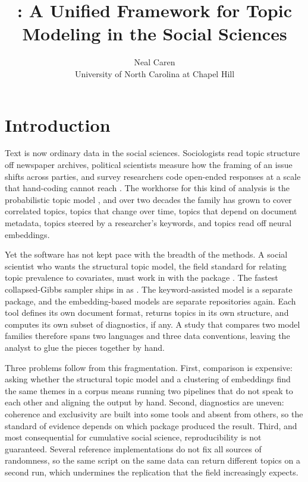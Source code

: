 \documentclass[article]{jss}
\author{Neal Caren\\University of North Carolina at Chapel Hill}
\title{\pkg{topica}: A Unified \proglang{Python} Framework for Topic Modeling
in the Social Sciences}
\begin{document}
\section{Introduction}\label{sec:intro}

Text is now ordinary data in the social sciences. Sociologists read topic
structure off newspaper archives, political scientists measure how the framing
of an issue shifts across parties, and survey researchers code open-ended
responses at a scale that hand-coding cannot reach \citep{dimaggio2013exploiting,
grimmer2013text, roberts2014structural, gentzkow2019text, grimmer2022text}. The
workhorse for this kind of analysis is the probabilistic topic model
\citep{blei2003lda, blei2012probabilistic}, and over two decades the family has
grown to cover correlated topics, topics that change over time, topics that
depend on document metadata, topics steered by a researcher's keywords, and
topics read off neural embeddings.

Yet the software has not kept pace with the breadth of the methods. A social
scientist who wants the structural topic model, the field standard for relating
topic prevalence to covariates, must work in  with the 
package \citep{roberts2016model, roberts2019stm}. The fastest collapsed-Gibbs
sampler ships in  as  \citep{mccallum2002mallet}. The
keyword-assisted model \citep{eshima2024keyatm} is a separate 
package, and the embedding-based models \citep{grootendorst2022bertopic,
angelov2020top2vec} are separate  repositories again. Each tool
defines its own document format, returns topics in its own structure, and
computes its own subset of diagnostics, if any. A study that compares two model
families therefore spans two languages and three data conventions, leaving the
analyst to glue the pieces together by hand.

Three problems follow from this fragmentation. First, comparison is expensive:
asking whether the structural topic model and a clustering of embeddings find
the same themes in a corpus means running two pipelines that do not speak to each
other and aligning the output by hand. Second, diagnostics are uneven: coherence
and exclusivity are built into some tools and absent from others, so the standard
of evidence depends on which package produced the result. Third, and
most consequential for cumulative social science, reproducibility is not
guaranteed. Several reference implementations do not fix all sources of
randomness, so the same script on the same data can return different topics on a
second run, which undermines the replication that the field increasingly
expects.
\end{document}
